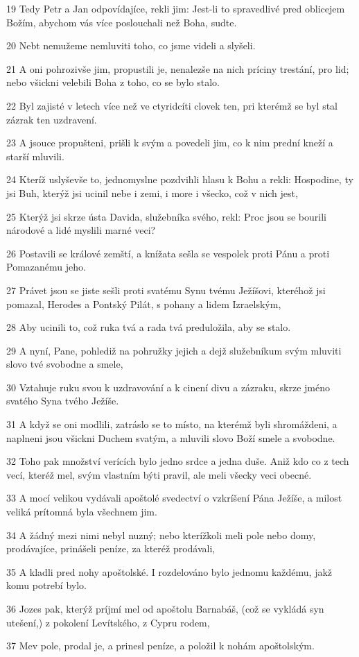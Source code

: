 \par 19 Tedy Petr a Jan odpovídajíce, rekli jim: Jest-li to spravedlivé pred oblicejem Božím, abychom vás více poslouchali než Boha, sudte.
\par 20 Nebt nemužeme nemluviti toho, co jsme videli a slyšeli.
\par 21 A oni pohrozivše jim, propustili je, nenalezše na nich príciny trestání, pro lid; nebo všickni velebili Boha z toho, co se bylo stalo.
\par 22 Byl zajisté v letech více než ve ctyridcíti clovek ten, pri kterémž se byl stal zázrak ten uzdravení.
\par 23 A jsouce propušteni, prišli k svým a povedeli jim, co k nim prední kneží a starší mluvili.
\par 24 Kteríž uslyševše to, jednomyslne pozdvihli hlasu k Bohu a rekli: Hospodine, ty jsi Buh, kterýž jsi ucinil nebe i zemi, i more i všecko, což v nich jest,
\par 25 Kterýž jsi skrze ústa Davida, služebníka svého, rekl: Proc jsou se bourili národové a lidé myslili marné veci?
\par 26 Postavili se králové zemští, a knížata sešla se vespolek proti Pánu a proti Pomazanému jeho.
\par 27 Právet jsou se jiste sešli proti svatému Synu tvému Ježíšovi, kteréhož jsi pomazal, Herodes a Pontský Pilát, s pohany a lidem Izraelským,
\par 28 Aby ucinili to, což ruka tvá a rada tvá preduložila, aby se stalo.
\par 29 A nyní, Pane, pohlediž na pohružky jejich a dejž služebníkum svým mluviti slovo tvé svobodne a smele,
\par 30 Vztahuje ruku svou k uzdravování a k cinení divu a zázraku, skrze jméno svatého Syna tvého Ježíše.
\par 31 A když se oni modlili, zatráslo se to místo, na kterémž byli shromáždeni, a naplneni jsou všickni Duchem svatým, a mluvili slovo Boží smele a svobodne.
\par 32 Toho pak množství verících bylo jedno srdce a jedna duše. Aniž kdo co z tech vecí, kteréž mel, svým vlastním býti pravil, ale meli všecky veci obecné.
\par 33 A mocí velikou vydávali apoštolé svedectví o vzkríšení Pána Ježíše, a milost veliká prítomná byla všechnem jim.
\par 34 A žádný mezi nimi nebyl nuzný; nebo kterížkoli meli pole nebo domy, prodávajíce, prinášeli peníze, za kteréž prodávali,
\par 35 A kladli pred nohy apoštolské. I rozdelováno bylo jednomu každému, jakž komu potrebí bylo.
\par 36 Jozes pak, kterýž príjmí mel od apoštolu Barnabáš, (což se vykládá syn utešení,) z pokolení Levítského, z Cypru rodem,
\par 37 Mev pole, prodal je, a prinesl peníze, a položil k nohám apoštolským.


